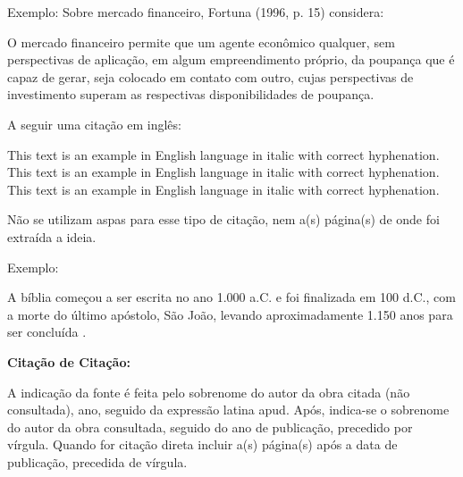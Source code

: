 \bigskip

{\color{red}
Exemplo:}
\bigskip
Sobre mercado financeiro, Fortuna (1996, p. 15) considera:\\
\bigskip

\begin{citacao}
O mercado financeiro permite que um agente econômico qualquer, sem perspectivas de aplicação, em algum empreendimento
próprio, da poupança que é capaz de gerar, seja colocado em contato com outro, cujas perspectivas de investimento
superam as respectivas disponibilidades de poupança.\\
\end{citacao}

\bigskip
A seguir uma citação em inglês:\\

\begin{citacao}[english]
This text is an example in English language in italic with correct hyphenation. This text is an example in English language in italic with correct hyphenation. This text is an example in English language in italic with correct hyphenation.
\end{citacao}
\bigskip


\bigskip

Não se utilizam aspas para esse tipo de citação, nem a(s) página(s) de onde foi extraída a ideia.\\

\bigskip

{\color{red}
Exemplo:}

\bigskip

A bíblia começou a ser escrita no ano 1.000 a.C. e foi finalizada em 100 d.C., com a morte do último apóstolo, São João, levando aproximadamente 1.150 anos para ser concluída \cite{book:GHELLER}.\\


\bigskip

{\centering\bfseries\color{red}
Citação de Citação:
\par}

\bigskip

A indicação da fonte é feita pelo sobrenome do autor da obra citada (não consultada), ano, seguido da expressão latina apud. Após, indica-se o sobrenome do autor da obra consultada, seguido do ano de publicação, precedido por vírgula. Quando for citação direta incluir a(s) página(s) após a data de publicação, precedida de vírgula.\\

